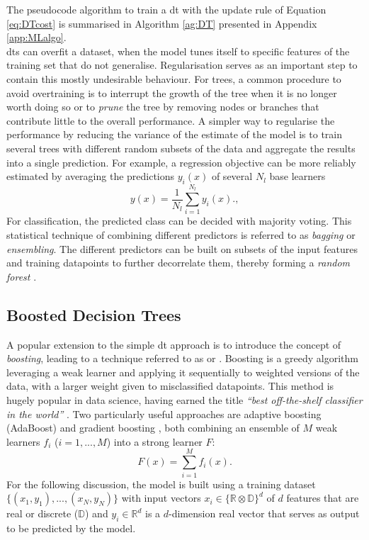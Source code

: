 The pseudocode algorithm to train a \gls{dt} with the update rule of Equation \ref{eq:DTcost} is summarised in Algorithm \ref{ag:DT} presented in Appendix \ref{app:MLalgo}. \\

\glspl{dt} can overfit a dataset, when the model tunes itself to specific features of the training set that do not generalise. Regularisation serves as an important step to contain this mostly undesirable behaviour. For trees, a common procedure to avoid overtraining is to interrupt the growth of the tree when it is no longer worth doing so or to \textit{prune} the tree by removing nodes or branches that contribute little to the overall performance. A simpler way to regularise the performance by reducing the variance of the estimate of the model is to train several trees with different random subsets of the data and aggregate the results into a single prediction. For example, a regression objective can be more reliably estimated by averaging the predictions $y_i(x)$ of several $N_l$ base learners \[ y(x) = \frac{1}{N_l} \sum_{i=1}^{N_l} y_i(x).,\] For classification, the predicted class can be decided with majority voting. This statistical technique of combining different predictors is referred to as \textit{bagging} or \textit{ensembling}. The different predictors can be built on subsets of the input features and training datapoints to further decorrelate them, thereby forming a \textit{random forest} \cite{russel2010}.

\subsection{Boosted Decision Trees}
A popular extension to the simple \gls{dt} approach is to introduce the concept of \textit{boosting}, leading to a technique referred to as \textit{} or \textit{}. Boosting is a greedy algorithm leveraging a weak learner and applying it sequentially to weighted versions of the data, with a larger weight given to misclassified datapoints. This method is hugely popular in data science, having earned the title \textit{``best off-the-shelf classifier in the world''} \cite{baggingML}. Two particularly useful approaches are adaptive boosting (AdaBoost) \cite{Adaboost} and gradient boosting \cite{gradientBoosting}, both combining an ensemble of $M$ weak learners $f_i$ ($i = 1, ..., M$) into a strong learner $F$: \[F(x) = \sum_{i=1}^M f_i(x).\] For the following discussion, the model is built using a training dataset $ \{(x_1, y_1), ..., (x_N, y_N)\}$ with input vectors $x_i \in \{\mathbb{R} \otimes \mathbb{D}\}^d$ of $d$ features that are real or discrete ($\mathbb{D}$) and $y_i \in \mathbb{R}^d$ is a $d$-dimension real vector that serves as output to be predicted by the model.

